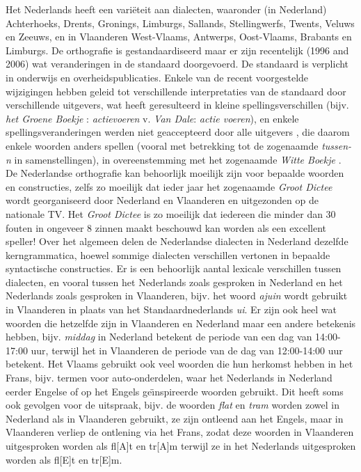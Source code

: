 \begin{multicols}{2}
    Het Nederlands heeft een vari{\"e}teit aan dialecten, waaronder (in Nederland) Achterhoeks, Drents, Gronings, Limburgs, Sallands, Stellingwerfs, Twents, Veluws en Zeeuws, en in Vlaanderen West-Vlaams, Antwerps, Oost-Vlaams, Brabants en Limburgs. De orthografie is gestandaardiseerd maar er zijn recentelijk (1996 and 2006) wat veranderingen in de standaard doorgevoerd. De standaard is verplicht in onderwijs en overheidspublicaties. Enkele van de recent voorgestelde wijzigingen hebben geleid tot verschillende interpretaties van de standaard door verschillende uitgevers, wat heeft geresulteerd in kleine spellingsverschillen (bijv. \emph{het Groene Boekje} \cite{GroeneBoekje}: \emph{actievoeren} v. \emph{Van Dale}: \emph{actie voeren}), en enkele spellingsveranderingen werden niet geaccepteerd door alle uitgevers \cite{Wittespellers} , die daarom enkele woorden anders spellen (vooral met betrekking tot de zogenaamde \emph{tussen-n} in samenstellingen), in overeenstemming met het zogenaamde \emph{Witte Boekje} \cite{Wittespelling}.  De Nederlandse orthografie kan behoorlijk moeilijk zijn voor bepaalde woorden en constructies, zelfs zo moeilijk dat ieder jaar het zogenaamde \emph{Groot Dictee} \cite{Grootdictee} wordt georganiseerd door Nederland en Vlaanderen en uitgezonden op de nationale TV. Het \emph{Groot Dictee} is zo moeilijk dat iedereen die minder dan 30 fouten in ongeveer 8 zinnen maakt beschouwd kan worden als een excellent speller! Over het algemeen delen de Nederlandse dialecten in Nederland dezelfde kerngrammatica, hoewel sommige dialecten verschillen vertonen in bepaalde syntactische constructies. Er is een behoorlijk aantal lexicale verschillen tussen dialecten, en vooral tussen het Nederlands zoals gesproken in Nederland en het Nederlands zoals gesproken in Vlaanderen, bijv. het woord \emph{ajuin} wordt gebruikt in Vlaanderen in plaats van het Standaardnederlands \emph{ui}. Er zijn ook heel wat woorden die hetzelfde zijn in Vlaanderen en Nederland maar een andere betekenis hebben, bijv. \emph{middag} in Nederland betekent de periode van een dag van 14:00-17:00 uur, terwijl het in Vlaanderen de periode van de dag van 12:00-14:00 uur betekent. Het Vlaams gebruikt ook veel woorden die hun herkomst hebben in het Frans, bijv. termen voor auto-onderdelen, waar het Nederlands in Nederland eerder Engelse of op het Engels ge{\"\i}nspireerde woorden gebruikt. Dit heeft soms ook gevolgen voor de uitspraak, bijv. de woorden \emph{flat} en \emph{tram} worden zowel in Nederland als in Vlaanderen gebruikt, ze zijn ontleend aan het Engels, maar in Vlaanderen verliep de ontlening via het Frans, zodat deze woorden in Vlaanderen uitgesproken worden als fl[A]t en tr[A]m terwijl ze in het Nederlands uitgesproken worden als fl[E]t en tr[E]m.


\end{multicols}
